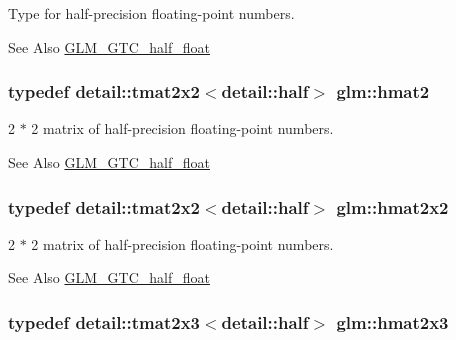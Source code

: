 Type for half-\/precision floating-\/point numbers. 

\begin{DoxySeeAlso}{See Also}
\hyperlink{group__gtc__half__float}{G\-L\-M\-\_\-\-G\-T\-C\-\_\-half\-\_\-float} 
\end{DoxySeeAlso}
\hypertarget{group__gtc__half__float_gaf5adf0fe534e1e97f0f162805c1a4dba}{
\subsubsection[{hmat2}]{\setlength{\rightskip}{0pt plus 5cm}typedef detail\-::tmat2x2$<$detail\-::half$>$ {\bf glm\-::hmat2}}}\label{group__gtc__half__float_gaf5adf0fe534e1e97f0f162805c1a4dba}


2 $\ast$ 2 matrix of half-\/precision floating-\/point numbers. 

\begin{DoxySeeAlso}{See Also}
\hyperlink{group__gtc__half__float}{G\-L\-M\-\_\-\-G\-T\-C\-\_\-half\-\_\-float} 
\end{DoxySeeAlso}
\hypertarget{group__gtc__half__float_ga8de844783e98b26f2d0f1be5dced0d43}{
\subsubsection[{hmat2x2}]{\setlength{\rightskip}{0pt plus 5cm}typedef detail\-::tmat2x2$<$detail\-::half$>$ {\bf glm\-::hmat2x2}}}\label{group__gtc__half__float_ga8de844783e98b26f2d0f1be5dced0d43}


2 $\ast$ 2 matrix of half-\/precision floating-\/point numbers. 

\begin{DoxySeeAlso}{See Also}
\hyperlink{group__gtc__half__float}{G\-L\-M\-\_\-\-G\-T\-C\-\_\-half\-\_\-float} 
\end{DoxySeeAlso}
\hypertarget{group__gtc__half__float_ga620d92d90c323bb52a5a3c4df9b44bda}{
\subsubsection[{hmat2x3}]{\setlength{\rightskip}{0pt plus 5cm}typedef detail\-::tmat2x3$<$detail\-::half$>$ {\bf glm\-::hmat2x3}}}\label{group__gtc__half__float_ga620d92d90c323bb52a5a3c4df9b44bda}



